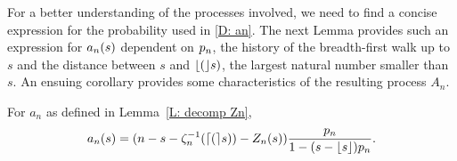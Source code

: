 For a better understanding of the processes involved, we need to find a concise expression for the probability used in \eqref{D: an}.
The next Lemma provides such an expression for $a_n(s)$ 
dependent on $p_n$, the history of the breadth-first walk up to $s$ and the distance between $s$ and $\lfloor(\rfloor s)$, 
the largest natural number smaller than $s$.
An ensuing corollary provides some characteristics of the resulting process $A_n$.

\begin{lemma} \label{L: formula an}
	For $a_n$ as defined in Lemma~\ref{L: decomp Zn},
	\begin{equation}
	a_n(s) = (n - s - \zeta^{-1}_n(\lceil(\rceil s)) - Z_n(s)) \frac{p_n}{1-(s-\lfloor s\rfloor)p_n} .
	\end{equation}
\end{lemma}

